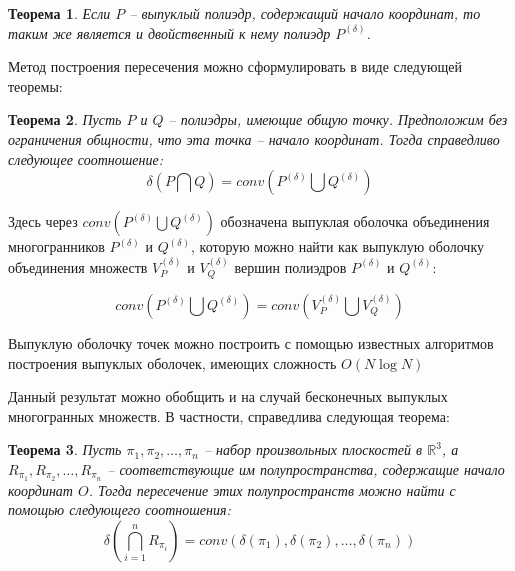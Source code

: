 \documentclass[a4paper, 12pt, titlepage]{article}
\theoremstyle{definition}
\theoremstyle{plain}
\newtheorem{SmartTheorem}{Теорема}
\theoremstyle{plain}
\begin{document}

\begin{SmartTheorem}
 Если $P$ -- выпуклый полиэдр, содержащий начало координат, то таким же является
 и двойственный к нему полиэдр $P^{(\delta)}$.
\end{SmartTheorem}

Метод построения пересечения можно сформулировать в виде следующей теоремы:

\begin{SmartTheorem}
 Пусть $P$ и $Q$ -- полиэдры, имеющие общую точку. Предположим без ограничения
 общности, что эта точка -- начало координат. Тогда справедливо следующее
 соотношение:
 \begin{equation}
  \delta(P \bigcap Q) = conv (P^{(\delta)} \bigcup Q^{(\delta)})
 \end{equation}
\end{SmartTheorem}

Здесь через $conv (P^{(\delta)} \bigcup Q^{(\delta)})$ обозначена выпуклая
оболочка объединения многогранников $P^{(\delta)}$ и $Q^{(\delta)}$, которую
можно найти как выпуклую оболочку объединения множеств $V_{P}^{(\delta)}$ и
$V_{Q}^{(\delta)}$ вершин полиэдров $P^{(\delta)}$ и $Q^{(\delta)}$:

\begin{equation}
 conv (P^{(\delta)} \bigcup Q^{(\delta)}) = conv (V_{P}^{(\delta)} \bigcup
 V_{Q}^{(\delta)})
\end{equation}

Выпуклую оболочку точек можно построить с помощью известных алгоритмов
построения выпуклых оболочек, имеющих сложность $O(N \log N)$

Данный результат можно обобщить и на случай бесконечных выпуклых многогранных
множеств. В частности, справедлива следующая теорема:

\begin{SmartTheorem}
 Пусть $\pi_{1}, \pi_{2}, \ldots, \pi_{n}$ -- набор произвольных плоскостей в
 $\mathbb{R}^{3}$, а $R_{\pi_{1}}, R_{\pi_{2}}, \ldots, R_{\pi_{n}}$ --
 соответствующие им полупространства, содержащие начало координат $O$. Тогда
 пересечение этих полупространств можно найти с помощью следующего соотношения:
 \begin{equation}
  \delta \left(\bigcap \limits_{i = 1}^{n} R_{\pi_{i}} \right) =
  conv (\delta(\pi_{1}), \delta(\pi_{2}), \ldots, \delta(\pi_{n}))
 \end{equation}
\end{SmartTheorem}
\end{document}
